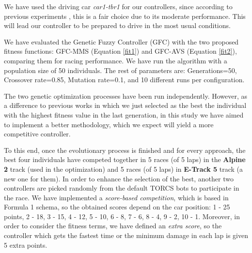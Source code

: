 \documentclass[conference]{IEEEtran}
\begin{document}
We have used the driving car  \textit{car1-tbr1} for our controllers, since according to previous experiments \cite{evo17}, this is a fair choice due to its moderate performance. This will lead our controller to be prepared to drive in the most usual conditions. 

We have evaluated the Genetic Fuzzy Controller (GFC) with the two proposed fitness functions: GFC-MMS (Equation \ref{fit1}) and GFC-AVS (Equation \ref{fit2}), comparing them for racing performance. We have run the algorithm with a population size of 50 individuals. The rest of parameters are: Generations=50, Crossover rate=0.85, Mutation rate=0.1, and 10 different runs per configuration.



The two genetic optimization processes have been run independently. However, as a difference to previous works in which we just selected as the best the individual with the highest fitness value in the last generation, in this study we have aimed to implement a better methodology, which we expect will yield a more competitive controller.

To this end, once the evolutionary process is finished and for every approach, the best four individuals have competed together in 5 races (of 5 laps) in the \textbf{Alpine 2} track (used in the optimization) and 5 races (of 5 laps) in \textbf{E-Track 5} track (a new one for them). 
In order to enhance the selection of the best, another two controllers are picked randomly from the default TORCS bots to participate in the race. 
We have implemented a \textit{score-based competition}, which is based in Formula 1 schema, so the obtained scores depend on the car position: 1 - 25 points, 2 - 18, 3 - 15, 4 - 12, 5 - 10, 6 - 8, 7 - 6, 8 - 4, 9 - 2, 10 - 1.
Moreover, in order to consider the fitness terms, we have defined an \textit{extra score}, so the controller which gets the fastest time or the minimum damage in each lap is given 5 extra points.
\end{document}
